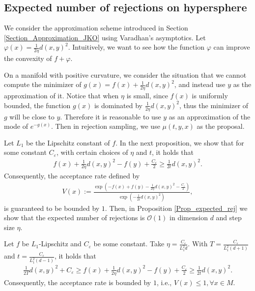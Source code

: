 \subsection{Expected number of rejections on hypersphere}\label{Subsection_expected_rej}

We consider the approximation scheme introduced in Section \ref{Section_Approximation_JKO} 
using Varadhan's asymptotics. 
Let $\varphi(x) = \frac{1}{2\eta} d(x, y)^{2}$. 
Intuitively, we want to see how the function $\varphi$ can improve the convexity of $f + \varphi$.

On a manifold with positive curvature, we consider the situation that we cannot compute the minimizer of $g(x) = f(x) + \frac{1}{2\eta}d(x, y)^{2} $, and instead use $y$ as the approximation of it. 
Notice that when $\eta$ is small, since $f(x)$ is uniformly bounded, the function $g(x)$ is dominated by $\frac{1}{2\eta}d(x, y)^{2}$, thus the minimizer of $g$ will be close to $y$. Therefore it is reasonable to use $y$ as an approximation of the mode of $e^{-g(x)}$.
Then in rejection sampling, we use $\mu(t, y, x)$ as the proposal.

Let $L_{1}$ be the Lipschitz constant of $f$. 
In the next proposition, we show that for some constant $C_{\varepsilon}$, with certain choices of $\eta$ and $t$, it holds that 
\begin{align*}
    f(x) + \frac{1}{2\eta} d(x, y)^{2} - f(y) + \frac{C_{\varepsilon}}{2} \ge \frac{1}{2t} d(x, y)^{2}.
\end{align*} 
Consequently, the acceptance rate defined by 
    \begin{align*}
        V(x) := \frac{\exp(- f(x) + f(y) - \frac{1}{2\eta} d(x, y)^{2} - \frac{C_{\varepsilon}}{2})}{\exp(-\frac{1}{2t} d(x, y)^{2})},
    \end{align*}
is guaranteed to be bounded by $1$. Then, in Proposition \ref{Prop_expected_rej} we show that the expected number of rejections is $\mathcal{O}(1)$ in dimension $d$ and step size $\eta$.

\begin{proposition}\label{prortt}
    Let $f$ be $L_{1}$-Lipschitz and $C_{\varepsilon}$ be some constant. Take $\eta = \frac{C_{\varepsilon}}{L_{1}^{2} d}$.
    With $T = \frac{C_{\varepsilon}}{L_{1}^{2}(d+1)}$ and $t = \frac{C_{\varepsilon}}{L_{1}^{2}(d-1)}$,
    it holds that 
    \begin{align*}
        \frac{1}{2T} d(x, y)^{2} + C_{\varepsilon}
        \ge f(x) + \frac{1}{2\eta} d(x, y)^{2} - f(y) + \frac{C_{\varepsilon}}{2}
        \ge \frac{1}{2t} d(x, y)^{2}.
    \end{align*}
    Consequently, the acceptance rate is bounded by $1$, i.e., $V(x) \le 1, \forall x \in M$.
\end{proposition}

